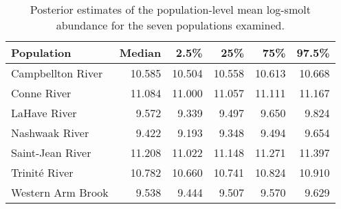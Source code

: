 \begin{table}[ht]
\centering
\caption{Posterior estimates of the population-level 
                    mean log-smolt abundance for the seven populations examined.} 
\begin{tabular}{lrrrrr}
  \hline
Population & Median & 2.5\% & 25\% & 75\% & 97.5\% \\ 
  \hline
Campbellton River & 10.585 & 10.504 & 10.558 & 10.613 & 10.668 \\ 
  Conne River & 11.084 & 11.000 & 11.057 & 11.111 & 11.167 \\ 
  LaHave River & 9.572 & 9.339 & 9.497 & 9.650 & 9.824 \\ 
  Nashwaak River & 9.422 & 9.193 & 9.348 & 9.494 & 9.654 \\ 
  Saint-Jean River & 11.208 & 11.022 & 11.148 & 11.271 & 11.397 \\ 
  Trinité River & 10.782 & 10.660 & 10.741 & 10.824 & 10.910 \\ 
  Western Arm Brook & 9.538 & 9.444 & 9.507 & 9.570 & 9.629 \\ 
   \hline
\end{tabular}
\end{table}
